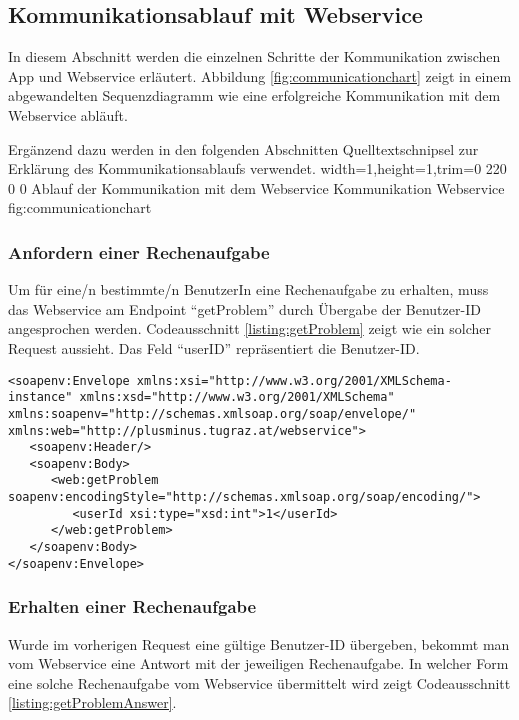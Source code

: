 \subsection{Kommunikationsablauf mit Webservice}
\label{subsec:communication}

In diesem Abschnitt werden die einzelnen Schritte der Kommunikation zwischen App und Webservice erläutert.
Abbildung \ref{fig:communicationchart} zeigt in einem abgewandelten Sequenzdiagramm wie eine erfolgreiche Kommunikation
mit dem Webservice abläuft. 

Ergänzend dazu werden in den folgenden Abschnitten Quelltextschnipsel
zur Erklärung des Kommunikationsablaufs verwendet.
  {width=1\textwidth,height=1\textheight,trim=0 220 0 0}%
  {Ablauf der Kommunikation mit dem Webservice}%
  {Kommunikation Webservice}%
  {fig:communicationchart}%

\subsubsection{Anfordern einer Rechenaufgabe}
Um für eine/n bestimmte/n BenutzerIn eine Rechenaufgabe zu erhalten, muss das Webservice am Endpoint \enquote{getProblem}
durch Übergabe der Benutzer-ID angesprochen werden. Codeausschnitt \ref{listing:getProblem} zeigt wie 
ein solcher Request aussieht. Das Feld \enquote{userID} repräsentiert die Benutzer-ID.

\begin{lstlisting}[caption=Anfordern einer Rechenaufgabe, label=listing:getProblem]
<soapenv:Envelope xmlns:xsi="http://www.w3.org/2001/XMLSchema-instance" xmlns:xsd="http://www.w3.org/2001/XMLSchema" xmlns:soapenv="http://schemas.xmlsoap.org/soap/envelope/" xmlns:web="http://plusminus.tugraz.at/webservice">
   <soapenv:Header/>
   <soapenv:Body>
      <web:getProblem soapenv:encodingStyle="http://schemas.xmlsoap.org/soap/encoding/">
         <userId xsi:type="xsd:int">1</userId>
      </web:getProblem>
   </soapenv:Body>
</soapenv:Envelope>
\end{lstlisting}

\subsubsection{Erhalten einer Rechenaufgabe}
Wurde im vorherigen Request eine gültige Benutzer-ID übergeben, bekommt man vom Webservice eine 
Antwort mit der jeweiligen Rechenaufgabe. In welcher Form eine solche Rechenaufgabe vom Webservice übermittelt
wird zeigt Codeausschnitt \ref{listing:getProblemAnswer}.

